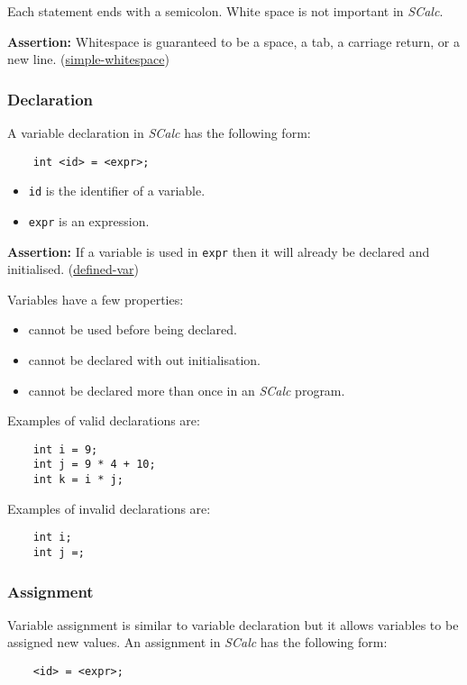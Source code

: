 \documentclass{article}
\newcommand{\code}[1]{\texttt{\textmd{#1}}}
\newcommand{\assertion}[2]{\textbf{Assertion: }#1 (\hyperlink{#2}{#2})}
\begin{document}
Each statement ends with a semicolon. White space is not important in \textit{SCalc}.

\assertion{Whitespace is guaranteed to be a space, a tab, a carriage return, or a new
line.}{simple-whitespace}

\subsubsection{Declaration}
\label{sssec:declaration}
A variable declaration in \textit{SCalc} has the following form:
\begin{lstlisting}
	int <id> = <expr>;
\end{lstlisting}

\begin{itemize}
	\item \code{id} is the identifier of a variable.
	\item \code{expr} is an expression.
\end{itemize}

\assertion{If a variable is used in \code{expr} then it will already be declared and initialised.}
{defined-var}

Variables have a few properties:
\begin{itemize}
  \item cannot be used before being declared.
  \item cannot be declared with out initialisation.
  \item cannot be declared more than once in an \textit{SCalc} program.
\end{itemize}

Examples of valid declarations are:
\begin{lstlisting}
	int i = 9;
	int j = 9 * 4 + 10;
	int k = i * j;
\end{lstlisting}

Examples of invalid declarations are:
\begin{lstlisting}
	int i;
	int j =;
\end{lstlisting}

\subsubsection{Assignment}
\label{sssec:assignment}
Variable assignment is similar to variable declaration but it allows variables to be assigned new
values. An assignment in \textit{SCalc} has the following form:
\begin{lstlisting}
	<id> = <expr>;
\end{lstlisting}
\end{document}
